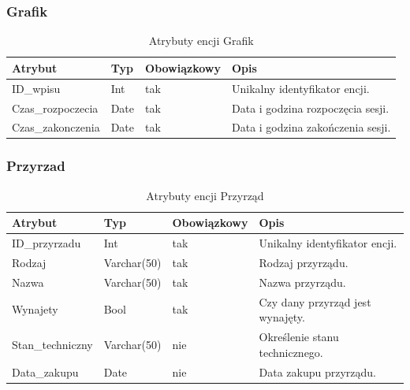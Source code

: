 \documentclass[11pt,a4paper]{article}
\begin{document}
\subsubsection{Grafik}
\begin{table}[H]
\centering
\small
\begin{tabularx}{\textwidth}{|L{3cm}|L{2.25cm}|C{2.67cm}|X|}
\hline
\textbf{Atrybut} & \textbf{Typ} & \textbf{Obowiązkowy} & \textbf{Opis} \\
\hline
ID\_wpisu & Int & tak & Unikalny identyfikator encji. \\
\hline
Czas\_rozpoczecia & Date & tak & Data i godzina rozpoczęcia sesji. \\
\hline
Czas\_zakonczenia & Date & tak & Data i godzina zakończenia sesji. \\
\hline
\end{tabularx}
\caption{Atrybuty encji Grafik}
\label{tab:atrybuty-encja-grafik}
\end{table}

\subsubsection{Przyrzad}
\begin{table}[H]
\centering
\small
\begin{tabularx}{\textwidth}{|L{3cm}|L{2.25cm}|C{2.67cm}|X|}
\hline
\textbf{Atrybut} & \textbf{Typ} & \textbf{Obowiązkowy} & \textbf{Opis} \\
\hline
ID\_przyrzadu & Int & tak & Unikalny identyfikator encji. \\
\hline
Rodzaj & Varchar(50) & tak & Rodzaj przyrządu. \\
\hline
Nazwa & Varchar(50) & tak & Nazwa przyrządu. \\
\hline
Wynajety & Bool & tak & Czy dany przyrząd jest wynajęty. \\
\hline
Stan\_techniczny & Varchar(50) & nie & Określenie stanu technicznego. \\
\hline
Data\_zakupu & Date & nie & Data zakupu przyrządu. \\
\hline
\end{tabularx}
\caption{Atrybuty encji Przyrząd}
\label{tab:atrybuty-encja-przyrzad}
\end{table}
\end{document}
